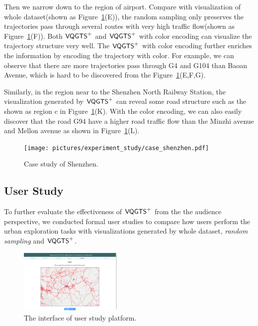 Then we narrow down to the region of airport. Compare with visualization of whole dataset(shown as Figure~\ref{fig:shenzhen}(E)), the random sampling only preserves the trajectories pass through several routes with very high traffic flow(shown as Figure~\ref{fig:shenzhen}(F)).  Both $\mathsf{VQGTS}^{+}$ and $\mathsf{VQGTS}^{+}$ with color encoding can visualize the trajectory structure very well. The $\mathsf{VQGTS}^{+}$ with color encoding further enriches the information by encoding the trajectory with color. For example, we can observe that there are more trajectories pass through G4 and G104 than Baoan Avenue, which is hard to be discovered from the Figure~\ref{fig:shenzhen}(E,F,G).  

Similarly, in the region near to the Shenzhen North Railway Station, the visualization generated by $\mathsf{VQGTS}^{+}$ can reveal some road structure such as the  shown as region c in Figure~\ref{fig:shenzhen}(K). With the color encoding, we can also easily discover that the road G94 have a higher road traffic flow than the Minzhi avenue and Mellon avenue as shown in Figure~\ref{fig:shenzhen}(L).

\begin{figure}[t]
	\centering
	\vspace{2mm}
	\texttt{[image: pictures/experiment\_study/case\_shenzhen.pdf]}
	\caption{Case study of Shenzhen.}
	\vspace{0mm}
	\label{fig:shenzhen}
\end{figure}


\subsection{User Study}
To further evaluate the effectiveness of $\mathsf{VQGTS}^{+}$ from the the audience perspective, we conducted formal user studies to compare how users perform the urban exploration tasks with visualizations generated by whole dataset, \textit{random sampling} and $\mathsf{VQGTS}^{+}$.


\begin{figure}[t]
	\centering
	\includegraphics[width=0.44\textwidth]{pictures/user_study/interface.jpg}
	\vspace{-3mm}
	\caption{The interface of user study platform.}
	\vspace{-5mm}
	\label{fig:user_study}
\end{figure}

